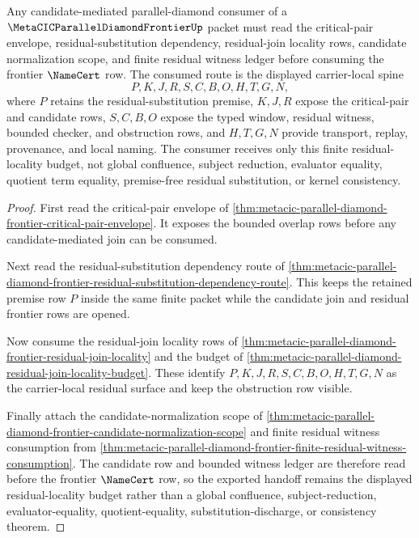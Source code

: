 \begin{theorem}
\label{thm:metacic-parallel-diamond-frontier-residual-join-locality-consumption}
Any candidate-mediated parallel-diamond consumer of a $\MetaCICParallelDiamondFrontierUp$ packet must read the critical-pair envelope, residual-substitution dependency, residual-join locality rows, candidate normalization scope, and finite residual witness ledger before consuming the frontier $\NameCert$ row. The consumed route is the displayed carrier-local spine
$$
P,K,J,R,S,C,B,O,H,T,G,N ,
$$
where $P$ retains the residual-substitution premise, $K,J,R$ expose the critical-pair and candidate rows, $S,C,B,O$ expose the typed window, residual witness, bounded checker, and obstruction rows, and $H,T,G,N$ provide transport, replay, provenance, and local naming. The consumer receives only this finite residual-locality budget, not global confluence, subject reduction, evaluator equality, quotient term equality, premise-free residual substitution, or kernel consistency.
\end{theorem}
\begin{proof}
First read the critical-pair envelope of \autoref{thm:metacic-parallel-diamond-frontier-critical-pair-envelope}. It exposes the bounded overlap rows before any candidate-mediated join can be consumed.

Next read the residual-substitution dependency route of \autoref{thm:metacic-parallel-diamond-frontier-residual-substitution-dependency-route}. This keeps the retained premise row $P$ inside the same finite packet while the candidate join and residual frontier rows are opened.

Now consume the residual-join locality rows of \autoref{thm:metacic-parallel-diamond-frontier-residual-join-locality} and the budget of \autoref{thm:metacic-parallel-diamond-residual-join-locality-budget}. These identify $P,K,J,R,S,C,B,O,H,T,G,N$ as the carrier-local residual surface and keep the obstruction row visible.

Finally attach the candidate-normalization scope of \autoref{thm:metacic-parallel-diamond-frontier-candidate-normalization-scope} and finite residual witness consumption from \autoref{thm:metacic-parallel-diamond-frontier-finite-residual-witness-consumption}. The candidate row and bounded witness ledger are therefore read before the frontier $\NameCert$ row, so the exported handoff remains the displayed residual-locality budget rather than a global confluence, subject-reduction, evaluator-equality, quotient-equality, substitution-discharge, or consistency theorem.
\end{proof}

